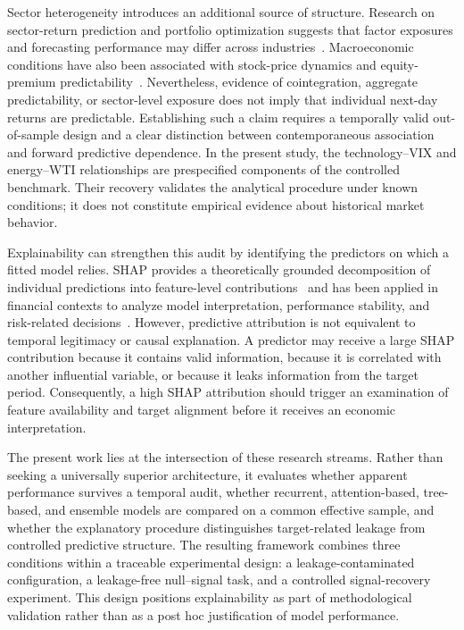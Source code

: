 \documentclass[utf8]{FrontiersinHarvard} %
\begin{document}
Sector heterogeneity introduces an additional source of structure. Research on sector-return prediction and portfolio optimization suggests that factor exposures and forecasting performance may differ across industries~\citep{Bessler2024}. Macroeconomic conditions have also been associated with stock-price dynamics and equity-premium predictability~\citep{Keswani2024,Buncic2017}. Nevertheless, evidence of cointegration, aggregate predictability, or sector-level exposure does not imply that individual next-day returns are predictable. Establishing such a claim requires a temporally valid out-of-sample design and a clear distinction between contemporaneous association and forward predictive dependence. In the present study, the technology--VIX and energy--WTI relationships are prespecified components of the controlled benchmark. Their recovery validates the analytical procedure under known conditions; it does not constitute empirical evidence about historical market behavior.

Explainability can strengthen this audit by identifying the predictors on which a fitted model relies. SHAP provides a theoretically grounded decomposition of individual predictions into feature-level contributions~\citep{Lundberg2017shap} and has been applied in financial contexts to analyze model interpretation, performance stability, and risk-related decisions~\citep{Wang2025shap,Chan2026financial,Zhang2026bond}. However, predictive attribution is not equivalent to temporal legitimacy or causal explanation. A predictor may receive a large SHAP contribution because it contains valid information, because it is correlated with another influential variable, or because it leaks information from the target period. Consequently, a high SHAP attribution should trigger an examination of feature availability and target alignment before it receives an economic interpretation.

The present work lies at the intersection of these research streams. Rather than seeking a universally superior architecture, it evaluates whether apparent performance survives a temporal audit, whether recurrent, attention-based, tree-based, and ensemble models are compared on a common effective sample, and whether the explanatory procedure distinguishes target-related leakage from controlled predictive structure. The resulting framework combines three conditions within a traceable experimental design: a leakage-contaminated configuration, a leakage-free null--signal task, and a controlled signal-recovery experiment. This design positions explainability as part of methodological validation rather than as a post hoc justification of model performance.
\end{document}
